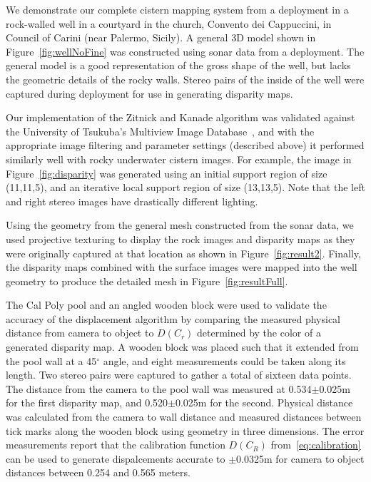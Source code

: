 \documentclass{llncs}
\begin{document}
\noindent We demonstrate our complete cistern mapping system from a deployment in a rock-walled well in a courtyard in the church, Convento dei Cappuccini, in Council of Carini (near Palermo, Sicily).
A general 3D model shown in Figure~\ref{fig:wellNoFine} was constructed using sonar data from a deployment. The general model is a good representation of the gross shape of the well, but lacks the geometric details of the rocky walls.
Stereo pairs of the inside of the well were captured during deployment for use in generating disparity maps.

Our implementation of the Zitnick and Kanade algorithm was validated against the University of Tsukuba's Multiview Image Database~\cite{stereo:zitKan}, and with the appropriate image filtering and parameter settings (described above) it performed similarly well with rocky underwater cistern images. For example, the image in Figure~\ref{fig:disparity} was generated using an initial support region of size (11,11,5), and an iterative local support region of size (13,13,5). Note that the left and right stereo images have drastically different lighting.

Using the geometry from the general mesh constructed from the sonar data, we used projective texturing to display the rock images and disparity maps as they were originally captured at that location as shown in Figure~\ref{fig:result2}. Finally, the disparity maps combined with the surface images were mapped into the well geometry to produce the detailed mesh in Figure~\ref{fig:resultFull}.

The Cal Poly pool and an angled wooden block were used to validate the accuracy of the displacement algorithm by comparing the measured physical distance from camera to object to $D(C_r)$ determined by the color of a generated disparity map. A wooden block was placed such that it extended from the pool wall at a 45$^{\circ}$ angle, and eight measurements could be taken along its length. Two stereo pairs were captured to gather a total of sixteen data points. The distance from the camera to the pool wall was measured at 0.534$\pm$0.025m for the first disparity map, and 0.520$\pm$0.025m for the second. Physical distance was calculated from the camera to wall distance and measured distances between tick marks along the wooden block using geometry in three dimensions. The error measurements report that the calibration function $D(C_R)$ from~\eqref{eq:calibration} can be used to generate dispalcements accurate to $\pm$0.0325m for camera to object distances between 0.254 and 0.565 meters.
\end{document}
